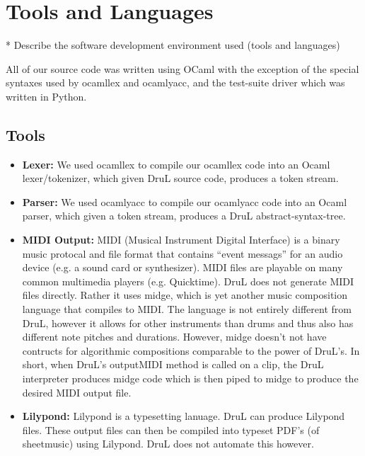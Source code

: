 \section{Tools and Languages}
* Describe the software development environment used (tools and languages)

All of our source code was written using OCaml with the exception of the special syntaxes used by ocamllex and ocamlyacc, and the test-suite driver which was written in Python.

\subsection{Tools}

\begin{itemize}
\item \textbf{Lexer:} We used ocamllex to compile our ocamllex code into an Ocaml lexer/tokenizer, which given DruL source code, produces a token stream.

\item \textbf{Parser:} We used ocamlyacc to compile our ocamlyacc code into an Ocaml parser, which given a token stream, produces a DruL abstract-syntax-tree.

\item \textbf{MIDI Output:} MIDI (Musical Instrument Digital Interface) is a binary music protocal and file format that contains ``event messags'' for an audio device (e.g. a sound card or synthesizer).  MIDI files are playable on many common multimedia players (e.g. Quicktime).  DruL does not generate MIDI files directly.  Rather it uses midge, which is yet another music composition language that compiles to MIDI.  The language is not entirely different from DruL, however it allows for other instruments than drums and thus also has different note pitches and durations.  However, midge doesn't not have contructs for algorithmic compositions comparable to the power of DruL's.  In short, when DruL's outputMIDI method is called on a clip, the DruL interpreter produces midge code which is then piped to midge to produce the desired MIDI output file.

\item \textbf{Lilypond:} Lilypond is a typesetting lanuage.  DruL can produce Lilypond files.  These output files can then be compiled into typeset PDF's (of sheetmusic) using Lilypond.  DruL does not automate this however.

\end{itemize}

